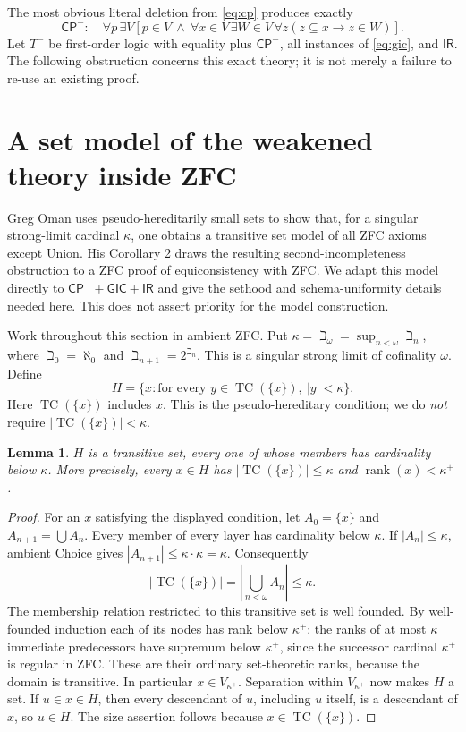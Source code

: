 \documentclass[11pt]{article}
\newtheorem{lemma}{Lemma}
\newcommand{\CP}{\mathsf{CP}}
\newcommand{\GIC}{\mathsf{GIC}}
\newcommand{\IR}{\mathsf{IR}}
\newcommand{\TC}{\operatorname{TC}}
\begin{document}
The most obvious literal deletion from \eqref{eq:cp} produces exactly
\begin{equation}\label{eq:cpminus}
 \CP^-:\quad\forall p\,\exists V\left[
 p\in V\ \land\ \forall x\in V\,\exists W\in V\,\forall z
       (z\subseteq x\longrightarrow z\in W)\right].
\end{equation}
Let $T^-$ be first-order logic with equality plus $\CP^-$, all instances of
\eqref{eq:gic}, and $\IR$.  The following obstruction concerns this exact
theory; it is not merely a failure to re-use an existing proof.

\section{A set model of the weakened theory inside ZFC}

Greg Oman uses pseudo-hereditarily small sets to show that, for a singular
strong-limit cardinal $\kappa$, one obtains a transitive set model of all ZFC
axioms except Union\cite[Theorem 1]{oman}.  His Corollary 2 draws the resulting
second-incompleteness obstruction to a ZFC proof of equiconsistency with ZFC.
We adapt this model directly to $\CP^-+\GIC+\IR$ and give the sethood and
schema-uniformity details needed here.  This does not assert priority for the
model construction.

Work throughout this section in ambient ZFC.  Put
$\kappa=\beth_\omega=\sup_{n<\omega}\beth_n$, where
$\beth_0=\aleph_0$ and $\beth_{n+1}=2^{\beth_n}$.  This is a singular strong
limit of cofinality $\omega$.  Define
\[
 H=\{x:\text{for every }y\in\TC(\{x\}),\ |y|<\kappa\}.
\]
Here $\TC(\{x\})$ includes $x$.  This is the pseudo-hereditary condition;
we do \emph{not} require $|\TC(\{x\})|<\kappa$.

\begin{lemma}\label{lem:set}
$H$ is a transitive set, every one of whose members has cardinality below
$\kappa$.  More precisely, every $x\in H$ has
$|\TC(\{x\})|\leq\kappa$ and $\operatorname{rank}(x)<\kappa^+$.
\end{lemma}
\begin{proof}
For an $x$ satisfying the displayed condition, let $A_0=\{x\}$ and
$A_{n+1}=\bigcup A_n$.  Every member of every layer has cardinality below
$\kappa$.  If $|A_n|\leq\kappa$, ambient Choice gives
$|A_{n+1}|\leq\kappa\cdot\kappa=\kappa$.  Consequently
\[
 |\TC(\{x\})|=\left|\bigcup_{n<\omega}A_n\right|\leq\kappa.
\]
The membership relation restricted to this transitive set is well founded.
By well-founded induction each of its nodes has rank below $\kappa^+$:
the ranks of at most $\kappa$ immediate predecessors have supremum below
$\kappa^+$, since the successor cardinal $\kappa^+$ is regular in ZFC.
These are their ordinary set-theoretic ranks, because the domain is
transitive.  In particular $x\in V_{\kappa^+}$.  Separation within
$V_{\kappa^+}$ now makes $H$ a set.  If $u\in x\in H$, then every descendant
of $u$, including $u$ itself, is a descendant of $x$, so $u\in H$.
The size assertion follows because $x\in\TC(\{x\})$.
\end{proof}
\end{document}
